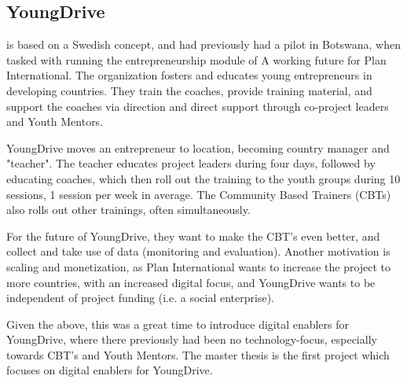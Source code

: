 \subsection{YoungDrive}

    \cite{youngdrive-web} is based on a Swedish concept, and had previously had a pilot in Botswana, when tasked with running the entrepreneurship module of A working future for Plan International. The organization fosters and educates young entrepreneurs in developing countries. They train the coaches, provide training material, and support the coaches via direction and direct support through co-project leaders and Youth Mentors.

    YoungDrive moves an entrepreneur to location, becoming country manager and "teacher". The teacher educates project leaders during four days, followed by educating coaches, which then roll out the training to the youth groups during 10 sessions, 1 session per week in average. The Community Based Trainers (CBTs) also rolls out other trainings, often simultaneously.

    For the future of YoungDrive, they want to make the CBT's even better, and collect and take use of data (monitoring and evaluation). Another motivation is scaling and monetization, as Plan International wants to increase the project to more countries, with an increased digital focus, and YoungDrive wants to be independent of project funding (i.e. a social enterprise).

    Given the above, this was a great time to introduce digital enablers for YoungDrive, where there previously had been no technology-focus, especially towards CBT's and Youth Mentors. The master thesis is the first project which focuses on digital enablers for YoungDrive.
